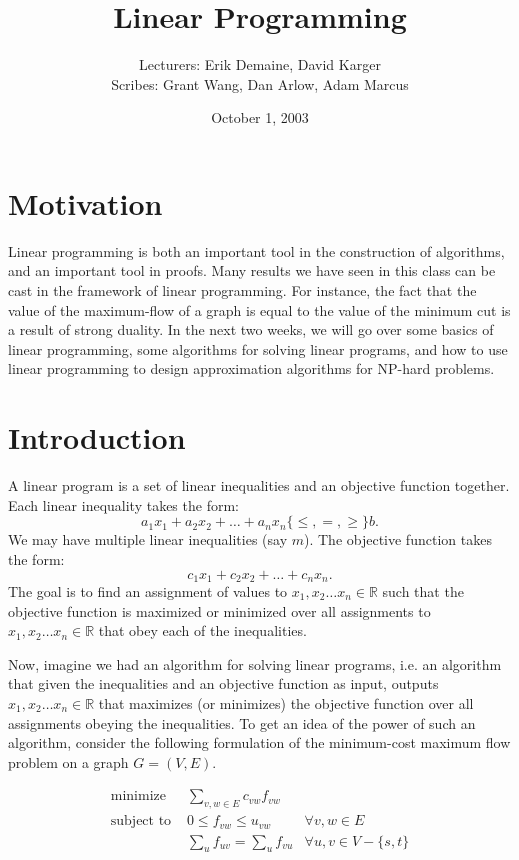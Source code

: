 \documentclass{article}
\title{Linear Programming}
\date{October 1, 2003}
\author{Lecturers: Erik Demaine, David Karger\\ Scribes: Grant Wang,  Dan Arlow,  Adam Marcus}
\newcommand{\reals}{\ensuremath{\mathbb{R}}}
\begin{document}
\maketitle

\section{Motivation}

Linear programming is both an important tool in the construction of
algorithms, and an important tool in proofs.  Many results we have
seen in this class can be cast in the framework of linear programming.
For instance, the fact that the value of the maximum-flow of a graph
is equal to the value of the minimum cut is a result of strong
duality.  In the next two weeks, we will go over some basics of linear
programming, some algorithms for solving linear programs, and how to
use linear programming to design approximation algorithms for NP-hard
problems.

\section{Introduction}

A linear program is a set of linear inequalities and an objective
function together.  Each linear inequality takes the form:
$$a_1 x_1 + a_2 x_2 + \dots + a_n x_n \{\leq,=,\geq \} b.$$
We may have
multiple linear inequalities (say $m$).  The objective function takes
the form:
$$c_1 x_1 + c_2 x_2 + \dots + c_n x_n.$$
The goal is to find an
assignment of values to $x_1, x_2 \dots x_n \in \reals$ such that the
objective function is maximized or minimized over all assignments to $x_1, x_2
\dots x_n \in \reals$ that obey each of the inequalities.

Now, imagine we had an algorithm for solving linear programs, i.e. an
algorithm that given the inequalities and an objective function as
input, outputs $x_1, x_2 \dots x_n \in \reals$ that maximizes (or minimizes) the
objective function over all assignments obeying the inequalities.  To
get an idea of the power of such an algorithm, consider
the following formulation of the minimum-cost maximum flow problem on a
graph $G=(V,E)$.

\begin{eqnarray*}
  \textrm{minimize } & \sum_{v,w \in E} c_{vw} f_{vw} &\\
  \textrm{subject to } &0 \leq f_{vw} \leq u_{vw} & \forall v,w \in E\\
  & \sum_u{f_{u v}} = \sum_u{f_{v u}} & \forall u,v \in V-\{s,t\}\\
\end{eqnarray*}
\end{document}
